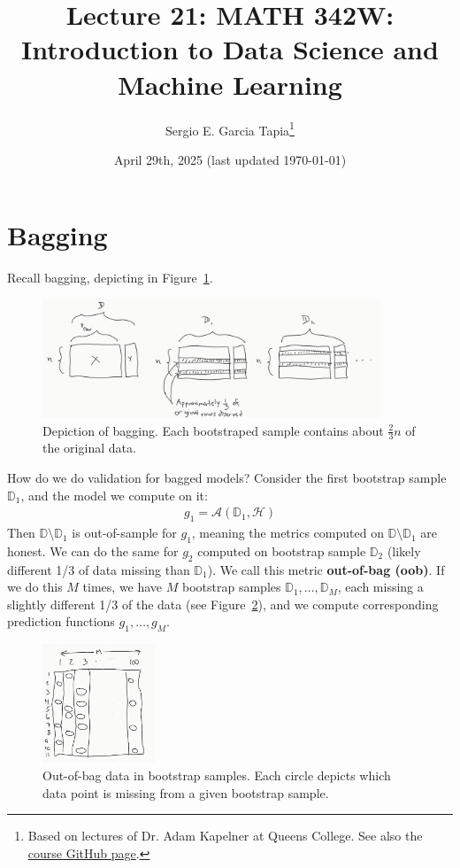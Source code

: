 \documentclass[12pt, a4paper]{article}
\title{Lecture 21: MATH 342W: Introduction to Data Science and Machine Learning}
\author{Sergio E. Garcia Tapia\thanks{Based on lectures of Dr. Adam Kapelner at Queens College.
See also the \href{https://github.com/kapelner/QC_MATH_342W_Spring_2025}{course GitHub page}.}}
\date{April 29th, 2025 (last updated \today)}
\theoremstyle{definition}
\begin{document}
	\maketitle
	\section*{Bagging}
	Recall bagging, depicting in Figure~\ref{fig:bagging}.
	\begin{figure}
		\centering
		\includegraphics[width=0.9\textwidth]{bagging}
		\caption{Depiction of bagging. Each bootstraped sample contains about $\frac{2}{3}n$ of
		the original data.}
		\label{fig:bagging}
	\end{figure}
	How do we do validation for bagged models? Consider the first bootstrap sample
	$\mathbb{D}_1$, and the model we compute on it:
	\begin{align*}
		g_1 = \mathcal{A}(\mathbb{D}_1, \mathcal{H})
	\end{align*}
	Then $\mathbb{D}\setminus \mathbb{D}_1$ is out-of-sample for $g_1$, meaning
	the metrics computed on $\mathbb{D}\setminus \mathbb{D}_1$ are honest.
	We can do the same for $g_2$ computed on bootstrap sample $\mathbb{D}_2$
	(likely different 1/3 of data missing than $\mathbb{D}_1$). We call this
	metric \textbf{out-of-bag (oob)}. If we do this $M$ times, we have $M$ bootstrap
	samples $\mathbb{D}_1,\ldots,\mathbb{D}_M$, each missing a slightly different 1/3
	of the data (see Figure~\ref{fig:oob-data}), and we compute corresponding
	prediction functions $g_1,\ldots,g_M$.
	\begin{figure}
		\centering
		\includegraphics[width=0.3\textwidth]{out-of-bag-data-in-bootstrap-samples}
		\caption{Out-of-bag data in bootstrap samples. Each circle depicts
		which data point is missing from a given bootstrap sample.}
		\label{fig:oob-data}
	\end{figure}
\end{document}
